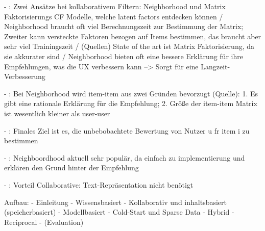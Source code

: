 - \cite[S. 1]{duong:2018}: Zwei Ansätze bei kollaborativem Filtern: Neighborhood und Matrix Faktorisierungs CF Modelle, welche latent factors entdecken können / Neighborhood braucht oft viel Berechnungszeit zur Bestimmung der Matrix; Zweiter kann versteckte Faktoren bezogen auf Items bestimmen, das braucht aber sehr viel Trainingszeit / (Quellen) State of the art ist Matrix Faktorisierung, da sie akkurater sind / Neighborhood bieten oft eine bessere Erklärung für ihre Empfehlungen, was die UX verbessern kann --> Sorgt für eine Langzeit-Verbesserung

- \cite[S. 2]{duong:2018}: Bei Neighborhood wird item-item aus zwei Gründen bevorzugt (Quelle): 1. Es gibt eine rationale Erklärung für die Empfehlung; 2. Größe der item-item Matrix ist wesentlich kleiner als user-user

- \cite[S. 2]{duong:2018}: Finales Ziel ist es, die unbebobachtete Bewertung von Nutzer u fr item i zu bestimmen

- \cite[S. 2]{duong:2018}: Neighboordhood aktuell sehr populär, da einfach zu implementierung und erklären den Grund hinter der Empfehlung

- \cite[S. 1]{lien:2014}: Vorteil Collaborative: Text-Repräsentation nicht benötigt

\newpage
Aufbau:
- Einleitung
- Wissensbasiert
- Kollaborativ und inhaltsbasiert (speicherbasiert)
- Modellbasiert
- Cold-Start und Sparse Data
- Hybrid
- Reciprocal
- (Evaluation)


